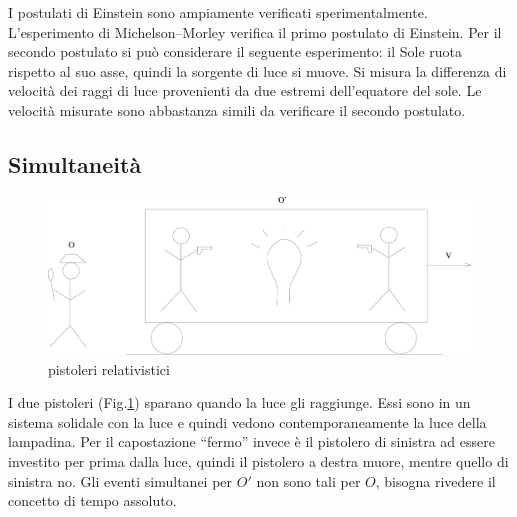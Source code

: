 I postulati di Einstein sono ampiamente verificati sperimentalmente. L'esperimento di Michelson--Morley verifica il primo postulato di Einstein. Per il secondo postulato si può considerare il seguente esperimento: il Sole ruota rispetto al suo asse, quindi la sorgente di luce si muove. Si misura la differenza di velocità dei raggi di luce provenienti da due estremi dell'equatore del sole. Le velocità misurate sono abbastanza simili da verificare il secondo postulato.

\subsection{Simultaneità}

\begin{figure}[htbp]
   \centering
   \includegraphics[scale=0.2]{immagini/fisica1/pistoleri}
   \caption{pistoleri relativistici}
   \label{pistoleri}
\end{figure}


I due pistoleri (Fig.\@ \ref{pistoleri}) sparano quando la luce gli raggiunge. Essi sono in un sistema solidale con la luce e quindi vedono contemporaneamente la luce della lampadina. Per il capostazione ``fermo'' invece è il pistolero di sinistra ad essere investito per prima dalla luce, quindi il pistolero a destra muore, mentre quello di sinistra no. Gli eventi simultanei per $O'$ non sono tali per $O$, bisogna rivedere il concetto di tempo assoluto.

